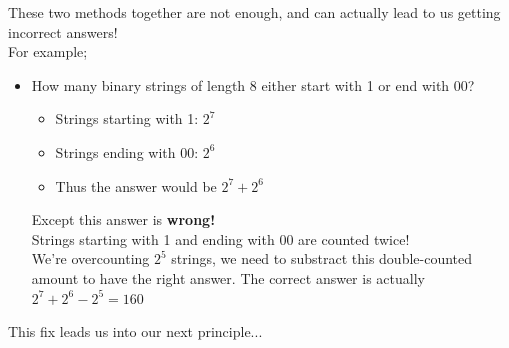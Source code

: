 \documentclass[12pt, letterpaper]{article}
\begin{document}
These two methods together are not enough, and can actually lead to us getting incorrect answers! \\ 
For example;
\begin{itemize}[leftmargin=*, label={}]
	\item How many binary strings of length 8 either start with 1 or end with 00?
	\begin{itemize}
		\item Strings starting with 1: $2^7$
		\item Strings ending with 00: $2^6$
		\item Thus the answer would be $2^7 + 2^6$
	\end{itemize}
	Except this answer is \textbf{wrong!} \\ Strings starting with 1 and ending with 00 are counted twice! \\
	We're overcounting $2^5$ strings, we need to substract this double-counted amount to have the right answer. The correct answer is actually $2^7 + 2^6 - 2^5 = 160$
\end{itemize}

This fix leads us into our next principle... 
\end{document}
